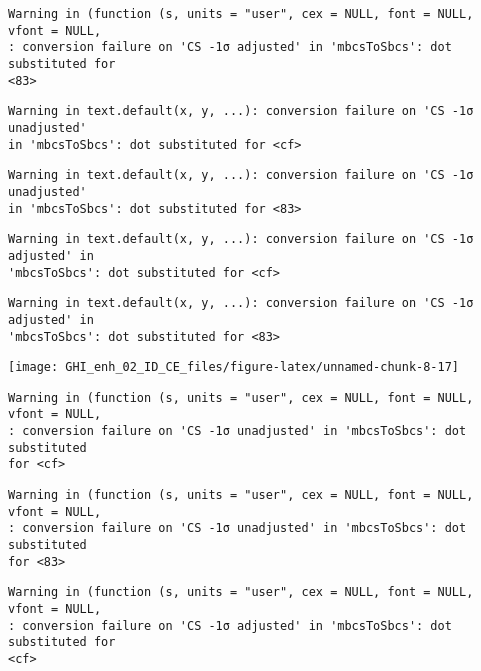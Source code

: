 \documentclass[
  10pt,
  a4paper,oneside]{article}
\begin{document}
\begin{verbatim}
Warning in (function (s, units = "user", cex = NULL, font = NULL, vfont = NULL,
: conversion failure on 'CS -1σ adjusted' in 'mbcsToSbcs': dot substituted for
<83>
\end{verbatim}

\begin{verbatim}
Warning in text.default(x, y, ...): conversion failure on 'CS -1σ unadjusted'
in 'mbcsToSbcs': dot substituted for <cf>
\end{verbatim}

\begin{verbatim}
Warning in text.default(x, y, ...): conversion failure on 'CS -1σ unadjusted'
in 'mbcsToSbcs': dot substituted for <83>
\end{verbatim}

\begin{verbatim}
Warning in text.default(x, y, ...): conversion failure on 'CS -1σ adjusted' in
'mbcsToSbcs': dot substituted for <cf>
\end{verbatim}

\begin{verbatim}
Warning in text.default(x, y, ...): conversion failure on 'CS -1σ adjusted' in
'mbcsToSbcs': dot substituted for <83>
\end{verbatim}

\begin{center}\texttt{[image: GHI\_enh\_02\_ID\_CE\_files/figure-latex/unnamed-chunk-8-17]} \end{center}

\begin{verbatim}
Warning in (function (s, units = "user", cex = NULL, font = NULL, vfont = NULL,
: conversion failure on 'CS -1σ unadjusted' in 'mbcsToSbcs': dot substituted
for <cf>
\end{verbatim}

\begin{verbatim}
Warning in (function (s, units = "user", cex = NULL, font = NULL, vfont = NULL,
: conversion failure on 'CS -1σ unadjusted' in 'mbcsToSbcs': dot substituted
for <83>
\end{verbatim}

\begin{verbatim}
Warning in (function (s, units = "user", cex = NULL, font = NULL, vfont = NULL,
: conversion failure on 'CS -1σ adjusted' in 'mbcsToSbcs': dot substituted for
<cf>
\end{verbatim}
\end{document}
